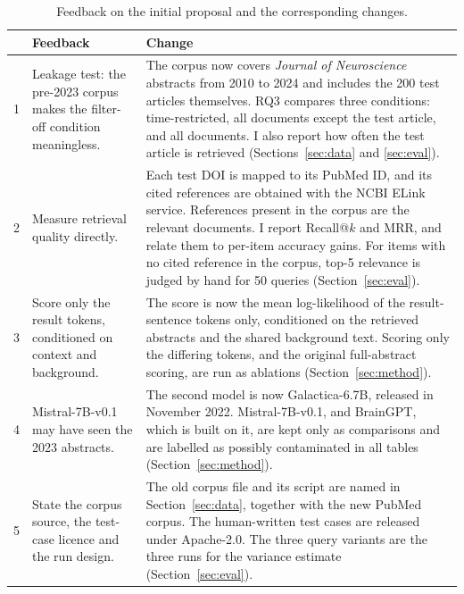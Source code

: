 \documentclass[10pt,a4paper]{article}
\begin{document}
\begin{table}[h]
\centering\small
\caption{Feedback on the initial proposal and the corresponding changes.}
\label{tab:feedback}
\begin{tabular}{p{0.3cm}p{4.6cm}p{10.8cm}}
\toprule
& Feedback & Change \\
\midrule
1 & Leakage test: the pre-2023 corpus makes the filter-off condition meaningless. &
The corpus now covers \emph{Journal of Neuroscience} abstracts from 2010 to 2024 and includes the 200 test articles themselves. RQ3 compares three conditions: time-restricted, all documents except the test article, and all documents. I also report how often the test article is retrieved (Sections~\ref{sec:data} and \ref{sec:eval}). \\
2 & Measure retrieval quality directly. &
Each test DOI is mapped to its PubMed ID, and its cited references are obtained with the NCBI ELink service. References present in the corpus are the relevant documents. I report Recall@$k$ and MRR, and relate them to per-item accuracy gains. For items with no cited reference in the corpus, top-5 relevance is judged by hand for 50 queries (Section~\ref{sec:eval}). \\
3 & Score only the result tokens, conditioned on context and background. &
The score is now the mean log-likelihood of the result-sentence tokens only, conditioned on the retrieved abstracts and the shared background text. Scoring only the differing tokens, and the original full-abstract scoring, are run as ablations (Section~\ref{sec:method}). \\
4 & Mistral-7B-v0.1 may have seen the 2023 abstracts. &
The second model is now Galactica-6.7B, released in November 2022. Mistral-7B-v0.1, and BrainGPT, which is built on it, are kept only as comparisons and are labelled as possibly contaminated in all tables (Section~\ref{sec:method}). \\
5 & State the corpus source, the test-case licence and the run design. &
The old corpus file and its script are named in Section~\ref{sec:data}, together with the new PubMed corpus. The human-written test cases are released under Apache-2.0. The three query variants are the three runs for the variance estimate (Section~\ref{sec:eval}). \\
\bottomrule
\end{tabular}
\end{table}
\end{document}
